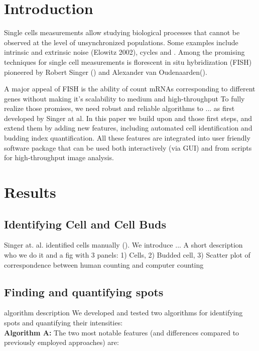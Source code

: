 \documentclass[10pt]{article}
\begin{document}
\begin{spacing}{1.5}
\section*{Introduction}

Single cells measurements allow studying biological processes that cannot be observed at the level of unsynchronized populations. Some examples include intrinsic and extrinsic noise (Elowitz 2002), cycles and . Among the promising techniques for single cell measurements is florescent in situ hybridization (FISH) pioneered by Robert Singer () and Alexander van Oudenaarden(). 

A major appeal of FISH is the ability of count mRNAs corresponding to different genes without making 
it's scalability to medium and high-throughput      
To fully realize those promises, we need robust and reliable algorithms to ... as first developed by Singer at al. In this paper we build upon and those first steps, and extend them by adding new features, including automated cell identification and budding index quantification. All these features are integrated into user friendly software package that can be used both interactively (via GUI) and from scripts for high-throughput image analysis.   




\section*{Results}

\subsection*{Identifying Cell and Cell Buds}
Singer at. al. identified cells manually (). We introduce ...  
A short description who we do it and a fig with 3 panels: 1) Cells, 2) Budded cell, 3) Scatter plot of correspondence between human counting and computer counting 

\subsection*{Finding and quantifying spots}
algorithm description 
We developed and tested two algorithms for identifying spots and quantifying their intensities: \\
\textbf{Algorithm A:} The two most notable features (and differences compared to previously employed approaches) are:


\end{spacing}
\end{document}
